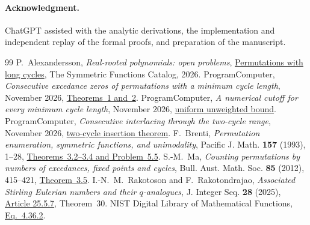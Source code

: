 \documentclass[11pt]{article}
\begin{document}
\paragraph{Acknowledgment.}
ChatGPT assisted with the analytic derivations, the implementation and independent replay of the formal proofs, and preparation of the manuscript.
\begin{thebibliography}{99}
P.~Alexandersson, \emph{Real-rooted polynomials: open problems},
\href{https://www.symmetricfunctions.com/realRootedOpenProblems.htm\#permutations-with-long-cycles}{Permutations with long cycles},
The Symmetric Functions Catalog, 2026.
ProgramComputer, \emph{Consecutive excedance zeros of permutations with a minimum cycle length}, November 2026,
\href{https://github.com/ProgramComputer/open-math-research/blob/4da48b72ed8f92f96c2faf60e2d63d253b3b507a/topics/long-cycle-excedances/paper.tex}{Theorems~1 and~2}.
ProgramComputer, \emph{A numerical cutoff for every minimum cycle length},
November 2026,
\href{https://github.com/ProgramComputer/open-math-research/blob/4da48b72ed8f92f96c2faf60e2d63d253b3b507a/topics/long-cycle-excedances/effective-interlacing.tex}{uniform unweighted bound}.
ProgramComputer, \emph{Consecutive interlacing through the two-cycle range}, November 2026,
\href{https://github.com/ProgramComputer/open-math-research/blob/4da48b72ed8f92f96c2faf60e2d63d253b3b507a/topics/long-cycle-excedances/two-cycle-insertion.tex}{two-cycle insertion theorem}.
F.~Brenti, \emph{Permutation enumeration, symmetric functions, and
unimodality}, Pacific J. Math. \textbf{157} (1993), 1--28,
\href{https://msp.org/pjm/1993/157-1/pjm-v157-n1-p01-s.pdf}{Theorems~3.2--3.4 and Problem~5.5}.
S.-M.~Ma, \emph{Counting permutations by numbers of excedances, fixed points
and cycles}, Bull. Aust. Math. Soc. \textbf{85} (2012), 415--421,
\href{https://doi.org/10.1017/S0004972711002760}{Theorem~3.5}.
I.-N.~M.~Rakotoson and F.~Rakotondrajao,
\emph{Associated Stirling Eulerian numbers and their \(q\)-analogues},
J. Integer Seq. \textbf{28} (2025),
\href{https://cs.uwaterloo.ca/journals/JIS/VOL28/Rakotoson/rakoto12.html}{Article 25.5.7},
Theorem~30.
NIST Digital Library of Mathematical Functions,
\href{https://dlmf.nist.gov/4.36.E2}{Eq.~4.36.2}.
\end{thebibliography}
\end{document}
